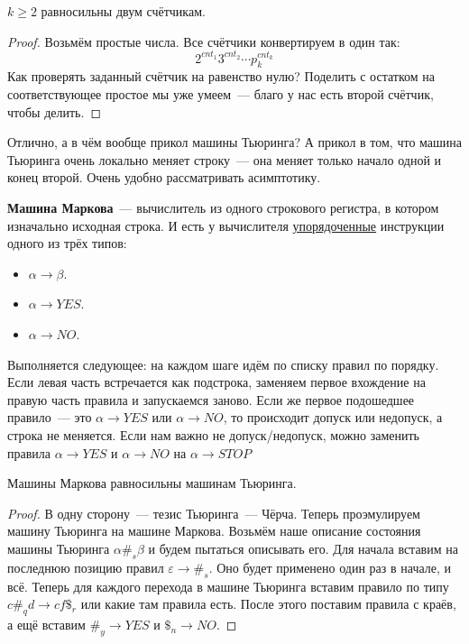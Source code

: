 \documentclass{article}
\begin{document}
    \begin{claim}
        $k\geqslant2$ равносильны двум счётчикам.
    \end{claim}
    \begin{proof}
        Возьмём простые числа. Все счётчики конвертируем в один так:
        $$
        2^{cnt_1}3^{cnt_2}\cdots p_k^{cnt_k}
        $$
        Как проверять заданный счётчик на равенство нулю? Поделить с остатком на соответствующее простое мы уже умеем~--- благо у нас есть второй счётчик, чтобы делить.
    \end{proof}
    \begin{remark}
        Отлично, а в чём вообще прикол машины Тьюринга? А прикол в том, что машина Тьюринга очень локально меняет строку~--- она меняет только начало одной и конец второй. Очень удобно рассматривать асимптотику.
    \end{remark}
    \begin{definition}
        \textbf{Машина Маркова}~--- вычислитель из одного строкового регистра, в котором изначально исходная строка. И есть у вычислителя \underline{упорядоченные} инструкции одного из трёх типов:
        \begin{itemize}
            \item $\alpha\to\beta$.
            \item $\alpha\to YES$.
            \item $\alpha\to NO$.
        \end{itemize}
        Выполняется следующее: на каждом шаге идём по списку правил по порядку. Если левая часть встречается как подстрока, заменяем первое вхождение на правую часть правила и запускаемся заново. Если же первое подошедшее правило~--- это $\alpha\to YES$ или $\alpha\to NO$, то происходит допуск или недопуск, а строка не меняется. Если нам важно не допуск/недопуск, можно заменить правила $\alpha\to YES$ и $\alpha\to NO$ на $\alpha\to STOP$
    \end{definition}
    \begin{claim}
        Машины Маркова равносильны машинам Тьюринга.
    \end{claim}
    \begin{proof}
        В одну сторону~--- тезис Тьюринга~--- Чёрча. Теперь проэмулируем машину Тьюринга на машине Маркова. Возьмём наше описание состояния машины Тьюринга $\alpha\#_s\beta$ и будем пытаться описывать его. Для начала вставим на последнюю позицию правил $\varepsilon\to\#_s$. Оно будет применено один раз в начале, и всё. Теперь для каждого перехода в машине Тьюринга вставим правило по типу $c\#_qd\to cf\$_r$ или какие там правила есть. После этого поставим правила с краёв, а ещё вставим $\#_y\to YES$ и $\$_n\to NO$.
    \end{proof}
\end{document}
